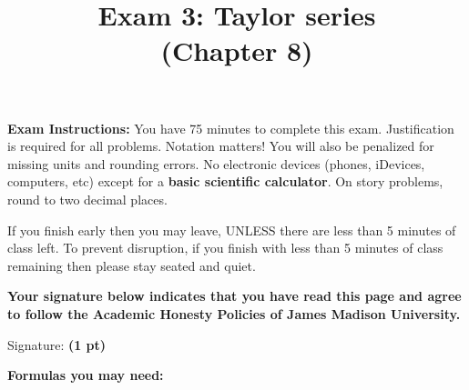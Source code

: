 \documentclass[12pt, addpoints]{exam/exam}
\title{\vspace{-8pc}
\vfill{\Huge
	\bf Exam 3: Taylor series \\ 
	(Chapter 8)} 
	}
\date{}
\newcommand{\1}{^{-1}}
\theoremstyle{plain}
\begin{document}
\begin{coverpages}
\maketitle
\thispagestyle{headandfoot}
\vspace{-4pc}
{\bf Exam Instructions:} You have 75 minutes to complete this exam.  Justification is required for all problems.  Notation matters!  You will also be penalized for missing units and rounding errors.  
No electronic devices (phones, iDevices, computers, etc) except for a \textbf{basic scientific calculator}.  On story problems, round to two decimal places. 

\vspace{1pc}
If you finish early then you may leave, UNLESS there are less than 5 minutes of class left.  To prevent disruption, if you finish with less than 5 minutes of class remaining then please stay seated and quiet.

\begin{flushright}

\vspace{0.3in}

\vspace{0.3in}
\end{flushright}

\vfill
\textbf{Your signature below indicates that you have read this page and agree to follow the Academic Honesty Policies of James Madison University.}  

\vspace{0.3in}
Signature: {\bf (1 pt)} \underline{\hspace{73ex}}

\newpage
\textbf{Formulas you may need:}
\vspace{0.5pc}


\end{coverpages}
\end{document}
